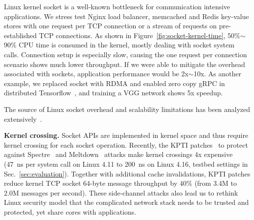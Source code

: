 Linux kernel socket is a well-known bottleneck for communication intensive applications. We stress test Nginx load balancer, memcached and Redis key-value stores with one request per TCP connection or a stream of requests on pre-established TCP connections. As shown in Figure~\ref{fig:socket-kernel-time}, 50\%$\sim$90\% CPU time is consumed in the kernel, mostly dealing with socket system calls. Connection setup is especially slow, causing the one request per connection scenario shows much lower throughput. If we were able to mitigate the overhead associated with sockets, application performance would be 2x$\sim$10x. As another example, we replaced socket with RDMA and enabled zero copy gRPC in distributed Tensorflow~\cite{abadi2016tensorflow}, and training a VGG network shows 5x speedup.







The source of Linux socket overhead and scalability limitations has been analyzed extensively~\cite{peter2016arrakis,lin2016scalable}.

\textbf{Kernel crossing.}
Socket APIs are implemented in kernel space and thus require kernel crossing for each socket operation. Recently, the KPTI patches~\cite{kpti} to protect against Spectre~\cite{Kocher2018spectre} and Meltdown~\cite{Lipp2018meltdown} attacks make kernel crossings 4x expensive (47~ns per system call on Linux 4.11 to 200~ns on Linux 4.16, testbed settings in Sec.~\ref{sec:evaluation}). Together with additional cache invalidations, KPTI patches reduce kernel TCP socket 64-byte message throughput by 40\% (from 3.4M to 2.0M messages per second). These side-channel attacks also lead us to rethink Linux security model that the complicated network stack needs to be trusted and protected, yet share cores with applications.


